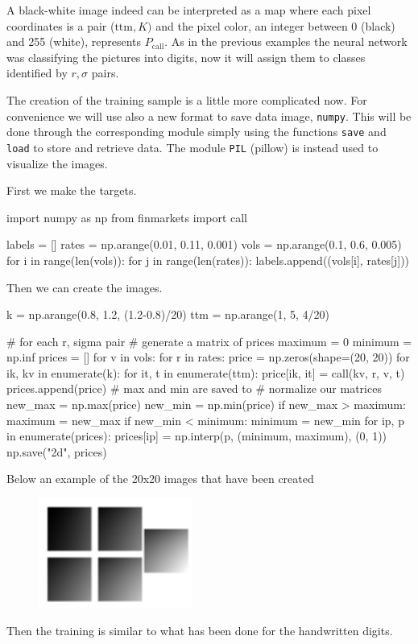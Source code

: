 A black-white image indeed can be interpreted as a map where each pixel coordinates
is a pair (\(\mathrm{ttm}, K)\) and the pixel color, an integer between
0 (black) and 255 (white), represents \(P_\textrm{call}\). As in the
previous examples the neural network was classifying the pictures into
digits, now it will assign them to classes identified by \(r, \sigma\)
pairs.

The creation of the training sample is a little more complicated now.
For convenience we will use also a new format to save data image,
\texttt{numpy}. This will be done through the corresponding module
simply using the functions \texttt{save} and \texttt{load} to store and
retrieve data. The module \texttt{PIL} (pillow) is instead used to
visualize the images.

First we make the targets.

\begin{ipython}
import numpy as np
from finmarkets import call

labels = []
rates = np.arange(0.01, 0.11, 0.001)
vols = np.arange(0.1, 0.6, 0.005)
for i in range(len(vols)):
    for j in range(len(rates)):
        labels.append((vols[i], rates[j]))
\end{ipython}
\noindent
Then we can create the images.

\begin{ipython}
k = np.arange(0.8, 1.2, (1.2-0.8)/20)
ttm = np.arange(1, 5, 4/20)

# for each r, sigma pair
# generate a matrix of prices
maximum = 0
minimum = np.inf
prices = []
for v in vols:
    for r in rates:
        price = np.zeros(shape=(20, 20))
        for ik, kv in enumerate(k):
            for it, t in enumerate(ttm):
                price[ik, it] = call(kv, r, v, t)
                prices.append(price)
                # max and min are saved to
                # normalize our matrices
                new_max = np.max(price)
                new_min = np.min(price)
                if new_max > maximum:
                    maximum = new_max
                if new_min < minimum:
                    minimum = new_min
for ip, p in enumerate(prices):
    prices[ip] = np.interp(p, (minimum, maximum), (0, 1))
np.save("2d", prices)
\end{ipython}
\noindent
Below an example of the 20x20 images that have been created
\begin{figure}[htb]
\centering
\includegraphics[width=0.45\textwidth]{figures/2d_training_images}
\end{figure}
\noindent
Then the training is similar to what has been done for the handwritten
digits.

